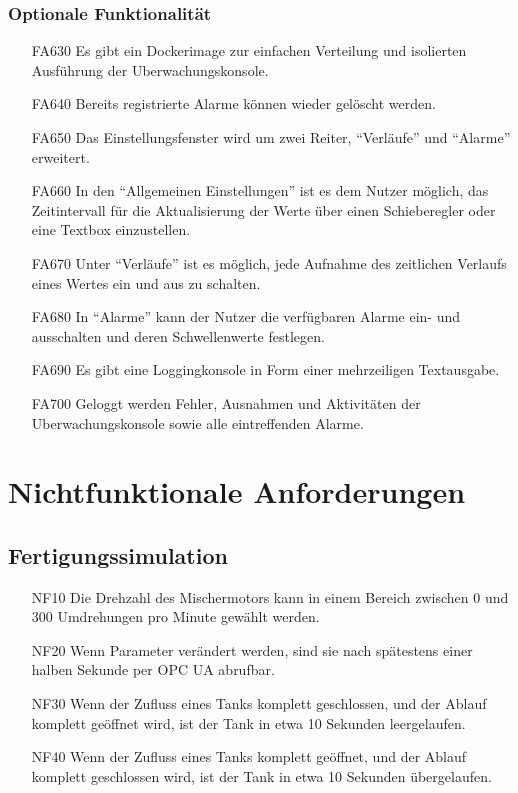 \documentclass[parskip=full]{scrartcl}
\begin{document}
\subsubsection{Optionale Funktionalität}
\label{konsole-optional}
\begin{enumerate}
  \item[FA630] Es gibt ein \gls{Dockerimage} zur einfachen Verteilung und isolierten Ausführung der \gls{Uberwachungskonsole}.
  \item[FA640] Bereits registrierte Alarme können wieder gelöscht werden.
  \item[FA650] Das Einstellungsfenster wird um zwei Reiter, "`Verläufe"' und "`Alarme"' erweitert.
  \item[FA660] In den "`Allgemeinen Einstellungen"' ist es dem Nutzer möglich, das Zeitintervall für die Aktualisierung der Werte über einen Schieberegler oder eine Textbox einzustellen.
  \item[FA670] Unter "`Verläufe"' ist es möglich, jede Aufnahme des zeitlichen Verlaufs eines Wertes ein und aus zu schalten.
  \item[FA680] In "`Alarme"' kann der Nutzer die verfügbaren Alarme ein- und ausschalten und deren Schwellenwerte festlegen.
  \item[FA690] Es gibt eine Loggingkonsole in Form einer mehrzeiligen Textausgabe.
  \item[FA700] Geloggt werden Fehler, Ausnahmen und Aktivitäten der \gls{Uberwachungskonsole} sowie alle eintreffenden Alarme.
\end{enumerate}

\pagebreak
\section{Nichtfunktionale Anforderungen}
\subsection{Fertigungssimulation}
\begin{enumerate}
  \item[NF10] Die Drehzahl des Mischermotors kann in einem Bereich zwischen 0 und 300 Umdrehungen pro Minute gewählt werden.
  \item[NF20] Wenn Parameter verändert werden, sind sie nach spätestens einer halben Sekunde per \gls{OPC UA} abrufbar.
  \item[NF30] Wenn der Zufluss eines Tanks komplett geschlossen, und der Ablauf komplett geöffnet wird, ist der Tank in etwa 10 Sekunden leergelaufen.
  \item[NF40] Wenn der Zufluss eines Tanks komplett geöffnet, und der Ablauf komplett geschlossen wird, ist der Tank in etwa 10 Sekunden übergelaufen.
\end{enumerate}
\end{document}
